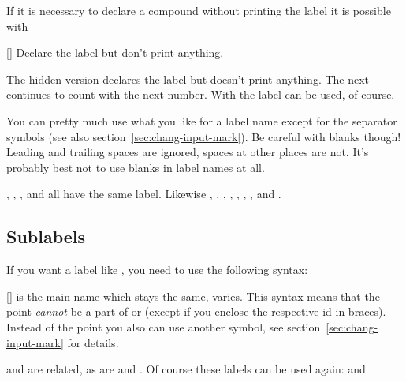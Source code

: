 \documentclass[load-preamble+,babel-options={ngerman,british,american}]{cnltx-doc}
\begin{document}
If it is necessary to declare a compound without printing the label it is
possible with
\begin{commands}
  [\sarg{}]
    Declare the label  but don't print anything.
\end{commands}

\begin{example}
  The hidden version declares the label but doesn't print anything.
  The next  continues to count with the next number.  With 
  the label can be used, of course.
\end{example}

You can pretty much use what you like for a label name except for the
separator symbols (see also section~\ref{sec:chang-input-mark}).  Be careful
with blanks though!  Leading and trailing spaces are ignored, spaces at other
places are not.  It's probably best not to use blanks in label names at all.

\begin{example}[add-sourcecode-options={showspaces=true}]
  , , , and  all have the same label.
  Likewise , , , , ,
  , , and .
\end{example}

\subsection{Sublabels}\label{sec:sublabel}
If you want a label like , you need to use the following syntax:
\begin{commands}
  []
     is the main name which stays the same,  varies.  This syntax means that the point 
    \emph{cannot} be a part of  or 
    (except if you enclose the respective \ac{id} in braces). Instead of the
    point you also can use another symbol, see
    section~\ref{sec:chang-input-mark} for details.
\end{commands}

\begin{example}
   and  are related, as are  and
  .  Of course these labels can be used again:  and
  .
\end{example}
\end{document}
